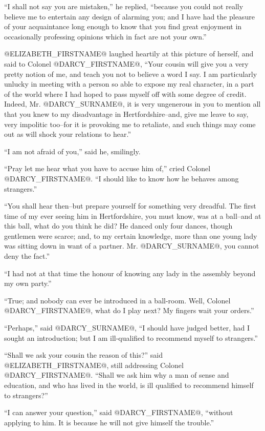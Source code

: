 ``I shall not say you are mistaken,'' he replied, ``because you could not
really believe me to entertain any design of alarming you; and I have
had the pleasure of your acquaintance long enough to know that you find
great enjoyment in occasionally professing opinions which in fact are
not your own.''

@ELIZABETH_FIRSTNAME@ laughed heartily at this picture of herself, and said to
Colonel @DARCY_FIRSTNAME@, ``Your cousin will give you a very pretty notion of
me, and teach you not to believe a word I say. I am particularly unlucky
in meeting with a person so able to expose my real character, in a part
of the world where I had hoped to pass myself off with some degree of
credit. Indeed, Mr. @DARCY_SURNAME@, it is very ungenerous in you to mention all
that you knew to my disadvantage in Hertfordshire--and, give me leave to
say, very impolitic too--for it is provoking me to retaliate, and such
things may come out as will shock your relations to hear.''

``I am not afraid of you,'' said he, smilingly.

``Pray let me hear what you have to accuse him of,'' cried Colonel
@DARCY_FIRSTNAME@. ``I should like to know how he behaves among strangers.''

``You shall hear then--but prepare yourself for something very dreadful.
The first time of my ever seeing him in Hertfordshire, you must know,
was at a ball--and at this ball, what do you think he did? He danced
only four dances, though gentlemen were scarce; and, to my certain
knowledge, more than one young lady was sitting down in want of a
partner. Mr. @DARCY_SURNAME@, you cannot deny the fact.''

``I had not at that time the honour of knowing any lady in the assembly
beyond my own party.''

``True; and nobody can ever be introduced in a ball-room. Well, Colonel
@DARCY_FIRSTNAME@, what do I play next? My fingers wait your orders.''

``Perhaps,'' said @DARCY_SURNAME@, ``I should have judged better, had I sought an
introduction; but I am ill-qualified to recommend myself to strangers.''

``Shall we ask your cousin the reason of this?'' said @ELIZABETH_FIRSTNAME@, still
addressing Colonel @DARCY_FIRSTNAME@. ``Shall we ask him why a man of sense and
education, and who has lived in the world, is ill qualified to recommend
himself to strangers?''

``I can answer your question,'' said @DARCY_FIRSTNAME@, ``without applying to
him. It is because he will not give himself the trouble.''

